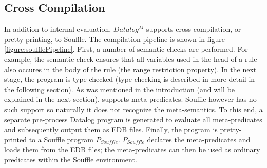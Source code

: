 \subsection{Cross Compilation}
In addition to internal evaluation, $Datalog^M$ supports cross-compilation, or pretty-printing, to Souffle\cite{SouffleHome}. The compilation pipeline is shown in figure \ref{figure:soufflePipeline}. First, a number of semantic checks are performed. For example, the semantic check ensures that all variables used in the head of a rule also occures in the body of the rule (the range restriction property\cite{Ceri:1989:YAW:627272.627357}). In the next stage, the program is type checked (type-checking is described in more detail in the following section). As was mentioned in the introduction (and will be explained in the next section), \datalogM supports meta-predicates. Souffle however has no such support so naturally it does not recognize the meta-semantics. To this end, a separate pre-process Datalog program is generated to evaluate all meta-predicates and subsequently output them as EDB files. Finally, the program is pretty-printed to a Souffle program $P_{Souffle}$. $P_{Souffle}$ declares the meta-predicates and loads them from the EDB files; the meta-predicates can then be used as ordinary predicates within the Souffle environment.